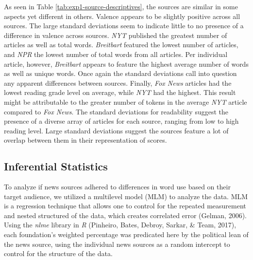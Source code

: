 \documentclass[
  english,
  man]{apa6}
\begin{document}
As seen in Table \ref{tab:exp1-source-descriptives}, the sources are similar in some aspects yet different in others. Valence appears to be slightly positive across all sources. The large standard deviations seem to indicate little to no presence of a difference in valence across sources. \emph{NYT} published the greatest number of articles as well as total words. \emph{Breitbart} featured the lowest number of articles, and \emph{NPR} the lowest number of total words from all articles. Per individual article, however, \emph{Breitbart} appears to feature the highest average number of words as well as unique words. Once again the standard deviations call into question any apparent differences between sources. Finally, \emph{Fox News} articles had the lowest reading grade level on average, while \emph{NYT} had the highest. This result might be attributable to the greater number of tokens in the average \emph{NYT} article compared to \emph{Fox News}. The standard deviations for readability suggest the presence of a diverse array of articles for each source, ranging from low to high reading level. Large standard deviations suggest the sources feature a lot of overlap between them in their representation of scores.

\hypertarget{inferential-statistics}{%
\subsection{Inferential Statistics}\label{inferential-statistics}}

To analyze if news sources adhered to differences in word use based on their target audience, we utilized a multilevel model (MLM) to analyze the data. MLM is a regression technique that allows one to control for the repeated measurement and nested structured of the data, which creates correlated error (Gelman, 2006). Using the \emph{nlme} library in \emph{R} (Pinheiro, Bates, Debroy, Sarkar, \& Team, 2017), each foundation's weighted percentage was predicated here by the political lean of the news source, using the individual news sources as a random intercept to control for the structure of the data.
\end{document}
